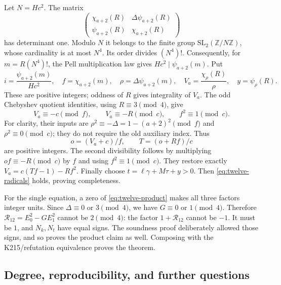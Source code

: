 Let $N=Hc^2$.  The matrix
\[
 \begin{pmatrix}
 \chi_{a+2}(R)&\Delta\psi_{a+2}(R)\\
 \psi_{a+2}(R)&\chi_{a+2}(R)
 \end{pmatrix}
\]
has determinant one.  Modulo $N$ it belongs to the finite group
$\mathrm{SL}_2(\mathbb Z/N\mathbb Z)$, whose cardinality is at most
$N^4$.  Its order divides $(N^4)!$.  Consequently, for
$m=R(N^4)!$, the Pell multiplication law gives
$Hc^2\mid\psi_{a+2}(m)$.  Put
\[
 i=\frac{\psi_{a+2}(m)}{Hc^2},\quad
 f=\chi_{a+2}(m),\quad \rho=\Delta\psi_{a+2}(m),\quad
 V_a=\frac{\chi_\rho(R)}\rho,\quad y=\psi_\rho(R).
\]
These are positive integers; oddness of $R$ gives integrality of $V_a$.
The odd Chebyshev quotient identities, using $R\equiv3\pmod4$,
give
\[
 V_a\equiv-c\pmod f,\qquad V_a\equiv-R\pmod c,
 \qquad f^2\equiv1\pmod c.
\]
For clarity, their inputs are
$\rho^2\equiv-\Delta=1-(a+2)^2\pmod f$ and
$\rho^2\equiv0\pmod c$; they do not require the old auxiliary index.
Thus
\[
 o=(V_a+c)/f,\qquad T=(o+Rf)/c
\]
are positive integers.  The second divisibility follows by multiplying
$of\equiv-R\pmod c$ by $f$ and using $f^2\equiv1\pmod c$.
They restore exactly $V_a=c(Tf-1)-Rf^2$.
Finally choose $t=\ell\gamma+M\tau+y>0$.  Then
\eqref{eq:twelve-radicals} holds, proving completeness.

For the single equation, a zero of \eqref{eq:twelve-product} makes
all three factors integer units.  Since $\Delta\equiv0$ or $3\pmod4$,
we have $G\equiv0$ or $1\pmod4$.  Therefore
$\mathcal R_{12}=E_0^2-GE_1^2$ cannot be $2\pmod4$:
the factor $1+\mathcal R_{12}$ cannot be $-1$.  It must be $1$,
and $N_k,N_t$ have equal signs.  The soundness proof deliberately
allowed those signs, and so proves the product claim as well.
Composing with the K215/refutation equivalence proves the theorem.

\subsection{Degree, reproducibility, and further questions}

